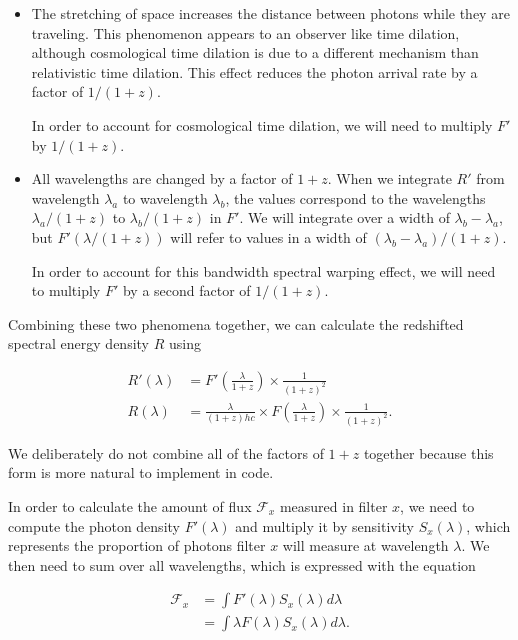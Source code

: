 \documentclass[linenumbers]{aastex631}
\begin{document}
\begin{itemize}
  \item The stretching of space increases the distance between photons while
  they are traveling. This phenomenon appears to an observer like time
  dilation, although cosmological time dilation is due to a different mechanism
  than relativistic time dilation. This effect reduces the photon arrival rate
  by a factor of $1/(1+z)$.

  In order to account for cosmological time dilation, we will need to multiply
  $F'$ by $1/(1+z)$.

  \item All wavelengths are changed by a factor of $1 + z$. When we integrate
  $R'$ from wavelength $\lambda_a$ to wavelength $\lambda_b$, the values
  correspond to the wavelengths $\lambda_a / (1+z)$ to $\lambda_b / (1+z)$ in
  $F'$. We will integrate over a width of $\lambda_b - \lambda_a$, but
  $F'(\lambda / (1+z))$ will refer to values in a width of
  $(\lambda_b - \lambda_a) / (1+z)$.

  In order to account for this bandwidth spectral warping effect, we will need
  to multiply $F'$ by a second factor of $1/(1+z)$.
\end{itemize}

Combining these two phenomena together, we can calculate the redshifted
spectral energy density $R$ using

\begin{equation}
\begin{aligned}
\label{eq:redshifted_density}
  R'(\lambda) &= F'\left(\frac{\lambda}{1+z}\right) \times \frac{1}{(1 + z)^2} \\
  R(\lambda) &= \frac{\lambda}{(1+z)hc} \times F\left(\frac{\lambda}{1+z}\right) \times \frac{1}{(1 + z)^2} .
\end{aligned}
\end{equation}

We deliberately do not combine all of the factors of $1+z$ together because
this form is more natural to implement in code.

In order to calculate the amount of flux $\mathcal{F}_x$ measured in filter
$x$, we need to compute the photon density $F'(\lambda)$ and multiply it by
sensitivity $S_x(\lambda)$, which represents the proportion of photons filter $x$
will measure at wavelength $\lambda$. We then need to sum over all wavelengths,
which is expressed with the equation

\begin{equation}
\begin{aligned}
\label{eq:flux_definition}
  \mathcal{F}_x &= \int F'(\lambda) S_x(\lambda) d\lambda \\
                &= \int \lambda F(\lambda) S_x(\lambda) d\lambda.
\end{aligned}
\end{equation}
\end{document}
